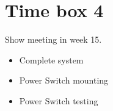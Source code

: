 \section{Time box 4}
Show meeting in week 15.
\begin{itemize}
	\item Complete system
	\item Power Switch mounting
	\item Power Switch testing
\end{itemize}